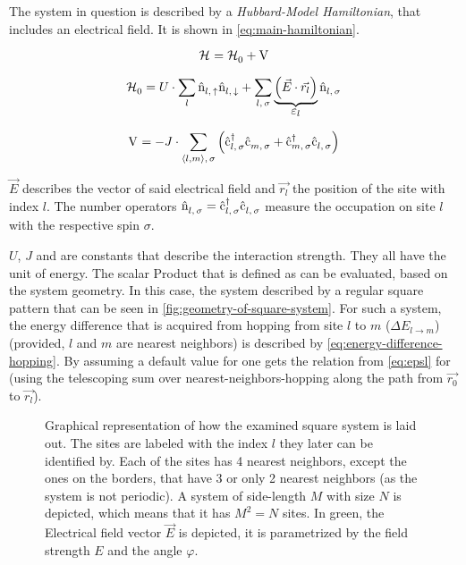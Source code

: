 The system in question is described by a \emph{Hubbard-Model Hamiltonian}, that includes an electrical field. It is shown in \autoref{eq:main-hamiltonian}.


\begin{equation}
    \label{eq:main-hamiltonian}
    \pictureHamiltonian = \HzeroHamiltonian + \Vhamiltonian
\end{equation}

\begin{equation}
    \label{eq:main-hamiltonian-h0}
    \HzeroHamiltonian = U \cdot \lsum \nop{l}{\up}\nop{l}{\down} + \lsum[l,\,\sigma] \underbrace{\left(\vec{E} \cdot \vec{r_l}\right)}_{\text{\normalsize \epsl}} \nop{l}{\sigma}
\end{equation}

\begin{equation}
    \label{eq:main-hamiltonian-pertubation}
    \Vhamiltonian =  - J \cdot \neighborsumWSpin{l}{m}{\sigma} \left(\withspinop{l}{\sigma}{\dagger} \withspinop{m}{\sigma}{} + \withspinop{m}{\sigma}{\dagger} \withspinop{l}{\sigma}{} \right)
\end{equation}

$\vec{E}$ describes the vector of said electrical field and $\vec{r_l}$ the position of the site with index $l$.
The number operators $\hat{\text{n}}^{ }_{l,\,\sigma} = \hat{\text{c}}^{\dagger }_{l,\,\sigma}\hat{\text{c}}^{ }_{l,\,\sigma}$ measure the occupation on site $l$ with the respective spin $\sigma$. 

$U$, $J$ and \epsl[] are constants that describe the interaction strength. 
They all have the unit of energy. 
The scalar Product that is defined as \epsl[] can be evaluated, based on the system geometry. 
In this case, the system described by a regular square pattern that can be seen in \autoref{fig:geometry-of-square-system}. 
For such a system, the energy difference that is acquired from hopping from site $l$ to $m$ ($\Delta E_{l \rightarrow m}$) (provided, $l$ and $m$ are nearest neighbors) is described by \autoref{eq:energy-difference-hopping}. By assuming a default value for \epsl[0] one gets the relation from \autoref{eq:epsl} for \epsl{} (using the telescoping sum over nearest-neighbors-hopping along the path from $\vec{r_0}$ to $\vec{r_l}$). 

\begin{figure}[htbp]
    \centering
            
    \vspace{0.8cm}
    \caption{Graphical representation of how the examined square system is laid out. The sites are labeled with the index $l$ they later can be identified by. Each of the sites has 4 nearest neighbors, except the ones on the borders, that have 3 or only 2 nearest neighbors (as the system is not periodic). A system of side-length $M$ with size $N$ is depicted, which means that it has $M^2 = N$ sites.
    In green, the Electrical field vector $\vec{E}$ is depicted, it is parametrized by the field strength $E$ and the angle $\varphi$.}
    \label{fig:geometry-of-square-system}
\end{figure}

